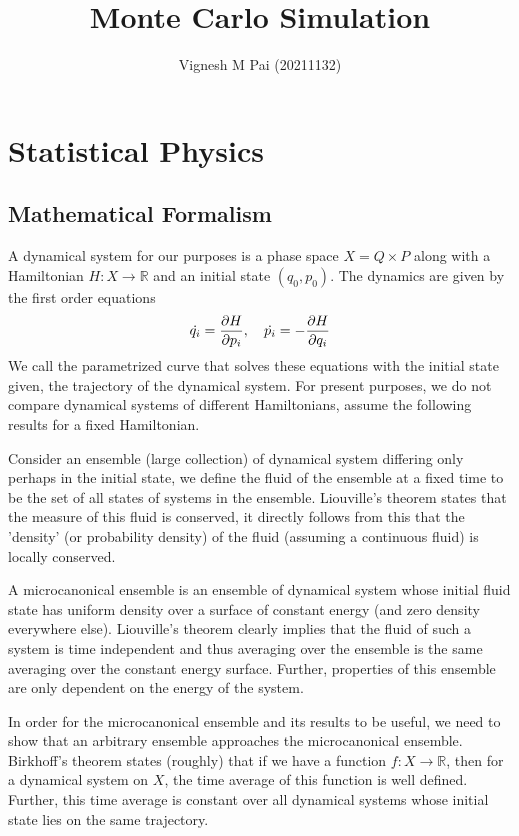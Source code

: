 \documentclass{article}
\title{Monte Carlo Simulation}
\author{Vignesh M Pai (20211132)}
\date{}
\begin{document}
\maketitle

\section{Statistical Physics}

\subsection{Mathematical Formalism}

A dynamical system for our purposes is a phase space $X = Q \times P$ along with a Hamiltonian $H: X \to \mathbb{R}$ and an initial state $(q_0, p_0)$.
The dynamics are given by the first order equations
\begin{align*}
    \dot{q_i} = \pdv{H}{p_i},\quad \dot{p_i} = - \pdv{H}{q_i}
\end{align*}
We call the parametrized curve that solves these equations with the initial state given, the trajectory of the dynamical system.
For present purposes, we do not compare dynamical systems of different Hamiltonians, assume the following results for a fixed Hamiltonian.

Consider an ensemble (large collection) of dynamical system differing only perhaps in the initial state,
we define the fluid of the ensemble at a fixed time to be the set of all states of systems in the ensemble.
Liouville's theorem states that the measure of this fluid is conserved, it directly follows from this that
the 'density' (or probability density) of the fluid (assuming a continuous fluid) is locally conserved.

A microcanonical ensemble is an ensemble of dynamical system whose initial fluid state has uniform density over a surface of constant energy (and zero density everywhere else).
Liouville's theorem clearly implies that the fluid of such a system is time independent
and thus averaging over the ensemble is the same averaging over the constant energy surface.
Further, properties of this ensemble are only dependent on the energy of the system.

In order for the microcanonical ensemble and its results to be useful, we need to show that an arbitrary ensemble approaches the microcanonical ensemble.
Birkhoff's theorem states (roughly) that if we have a function $f: X \to \mathbb{R}$, then for a dynamical system on $X$, the time average of this function is well defined.
Further, this time average is constant over all dynamical systems whose initial state lies on the same trajectory.
\end{document}
